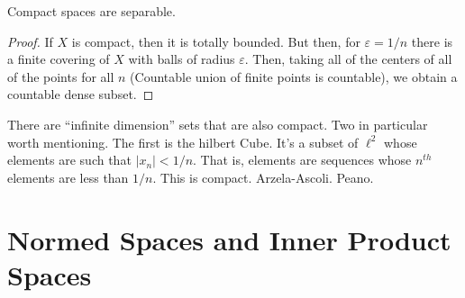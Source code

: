 \documentclass[crop=false,class=book,oneside]{standalone}
\begin{document}
                \begin{theorem}
                    Compact spaces are separable.
                \end{theorem}
                \begin{proof}
                    If $X$ is compact, then
                    it is totally bounded. But
                    then, for $\varepsilon=1/n$
                    there is a finite covering of
                    $X$ with balls of radius
                    $\varepsilon$. Then,
                    taking all of the
                    centers of all of the points
                    for all $n$ (Countable union
                    of finite points is countable),
                    we obtain a countable dense
                    subset.
                \end{proof}
                \begin{example}
                    There are ``infinite dimension''
                    sets that are also compact. Two
                    in particular worth mentioning.
                    The first is the hilbert Cube.
                    It's a subset of $\ell^{2}$
                    whose elements are such that
                    $|x_{n}|<1/n$. That is, elements
                    are sequences whose $n^{th}$
                    elements are less than
                    $1/n$. This is compact.
                    Arzela-Ascoli. Peano.
                \end{example}
    \section{Normed Spaces and Inner Product Spaces}
\end{document}
